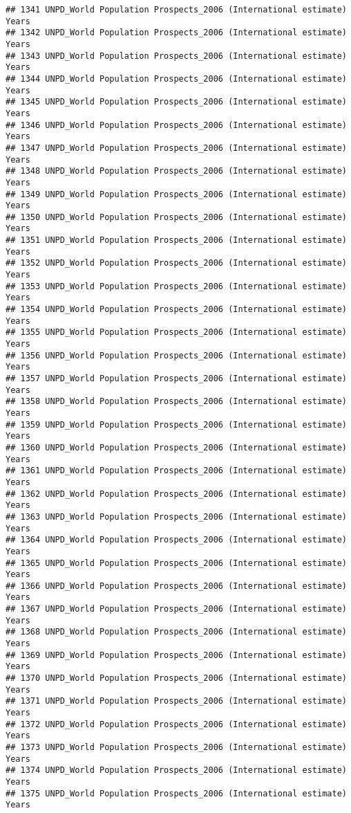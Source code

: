 \documentclass[]{article}
\begin{document}
\begin{verbatim}
## 1341 UNPD_World Population Prospects_2006 (International estimate) Years
## 1342 UNPD_World Population Prospects_2006 (International estimate) Years
## 1343 UNPD_World Population Prospects_2006 (International estimate) Years
## 1344 UNPD_World Population Prospects_2006 (International estimate) Years
## 1345 UNPD_World Population Prospects_2006 (International estimate) Years
## 1346 UNPD_World Population Prospects_2006 (International estimate) Years
## 1347 UNPD_World Population Prospects_2006 (International estimate) Years
## 1348 UNPD_World Population Prospects_2006 (International estimate) Years
## 1349 UNPD_World Population Prospects_2006 (International estimate) Years
## 1350 UNPD_World Population Prospects_2006 (International estimate) Years
## 1351 UNPD_World Population Prospects_2006 (International estimate) Years
## 1352 UNPD_World Population Prospects_2006 (International estimate) Years
## 1353 UNPD_World Population Prospects_2006 (International estimate) Years
## 1354 UNPD_World Population Prospects_2006 (International estimate) Years
## 1355 UNPD_World Population Prospects_2006 (International estimate) Years
## 1356 UNPD_World Population Prospects_2006 (International estimate) Years
## 1357 UNPD_World Population Prospects_2006 (International estimate) Years
## 1358 UNPD_World Population Prospects_2006 (International estimate) Years
## 1359 UNPD_World Population Prospects_2006 (International estimate) Years
## 1360 UNPD_World Population Prospects_2006 (International estimate) Years
## 1361 UNPD_World Population Prospects_2006 (International estimate) Years
## 1362 UNPD_World Population Prospects_2006 (International estimate) Years
## 1363 UNPD_World Population Prospects_2006 (International estimate) Years
## 1364 UNPD_World Population Prospects_2006 (International estimate) Years
## 1365 UNPD_World Population Prospects_2006 (International estimate) Years
## 1366 UNPD_World Population Prospects_2006 (International estimate) Years
## 1367 UNPD_World Population Prospects_2006 (International estimate) Years
## 1368 UNPD_World Population Prospects_2006 (International estimate) Years
## 1369 UNPD_World Population Prospects_2006 (International estimate) Years
## 1370 UNPD_World Population Prospects_2006 (International estimate) Years
## 1371 UNPD_World Population Prospects_2006 (International estimate) Years
## 1372 UNPD_World Population Prospects_2006 (International estimate) Years
## 1373 UNPD_World Population Prospects_2006 (International estimate) Years
## 1374 UNPD_World Population Prospects_2006 (International estimate) Years
## 1375 UNPD_World Population Prospects_2006 (International estimate) Years

\end{verbatim}
\end{document}
